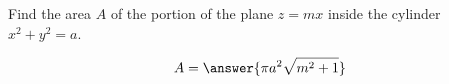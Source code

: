 \documentclass{ximera}
\author{David Guichard \and Neal Koblitz \and H. Jerome Keisler \and Albert Scheller \and Barry Balof \and Mike Wills \and Matthew Carr}
\begin{document}
\begin{exercise}





Find the area $A$ of the portion of the plane $z=mx$ inside the cylinder $x^2+y^2=a$.
\begin{prompt}
\[
A=\answer{\pi a^2 \sqrt{m^2+1}}
\]
\end{prompt}



\end{exercise}
\end{document}
